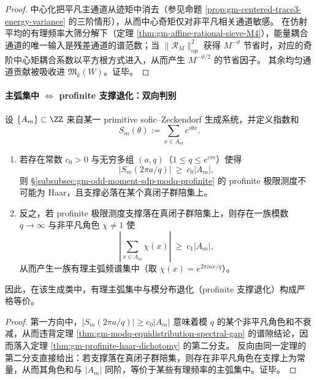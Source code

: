 \begin{proof}
中心化把平凡主通道从迹矩中消去（参见命题 \ref{prop:gm-centered-trace3-energy-variance} 的三阶情形），从而中心奇矩仅对非平凡相关通道敏感。
在仿射平均的有理频率大筛分解下（定理 \ref{thm:gm-affine-rational-sieve-M4}），能量耦合通道的唯一输入是残差通道的谱范数；当 \(\|\mathcal{R}_M\|_{\mathrm{op}}^2\) 获得 \(M^{-\vartheta}\) 节省时，对应的奇阶中心矩耦合系数以平方根方式进入，从而产生 \(M^{-\vartheta/2}\) 的节省因子。
其余均匀通道贡献被吸收进 \(\mathfrak{M}_k(W)\)。证毕。
\end{proof}

\paragraph{主弧集中 \texorpdfstring{$\Longleftrightarrow$}{<->} profinite 支撑退化：双向判别}
\begin{theorem}\label{thm:gm-major-arc-profinite-equivalence}
设 \(\{A_m\}\subset\ZZ\) 来自某一 primitive sofic--Zeckendorf 生成系统，并定义指数和
\[
S_m(\theta):=\sum_{x\in A_m}e^{i\theta x}.
\]
\begin{enumerate}
  \item 若存在常数 \(c_0>0\) 与无穷多组 \((a,q)\)（\(1\le q\le e^{cm}\)）使得
  \[
  |S_m(2\pi a/q)|\ \ge\ c_0|A_m|,
  \]
  则 \S\ref{subsubsec:gm-odd-moment-sdp-modq-profinite} 的 profinite 极限测度不可能为 Haar，且支撑必落在某个真闭子群陪集上。
  \item 反之，若 profinite 极限测度支撑落在真闭子群陪集上，则存在一族模数 \(q\to\infty\) 与非平凡角色 \(\chi\neq 1\) 使
  \[
  \left|\sum_{x\in A_m}\chi(x)\right|\ \ge\ c_1|A_m|,
  \]
  从而产生一族有理主弧频谱集中（取 \(\chi(x)=e^{2\pi i a x/q}\)）。
\end{enumerate}
因此，在该生成类中，有理主弧集中与模分布退化（profinite 支撑退化）构成严格等价。
\end{theorem}

\begin{proof}
第一方向中，\(|S_m(2\pi a/q)|\ge c_0|A_m|\) 意味着模 \(q\) 的某个非平凡角色和不衰减，从而违背定理 \ref{thm:gm-modq-equidistribution-spectral-gap} 的谱隙结论，因而落入定理 \ref{thm:gm-profinite-haar-dichotomy} 的第二分支。
反向由同一定理的第二分支直接给出：若支撑落在真闭子群陪集，则存在非平凡角色在支撑上为常量，从而其角色和与 \(|A_m|\) 同阶，等价于某些有理频率的主弧集中。证毕。
\end{proof}

